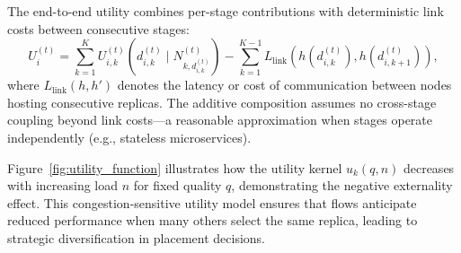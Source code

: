 \documentclass[journal]{IEEEtran}
\theoremstyle{plain}
\theoremstyle{definition}
\theoremstyle{remark}
\begin{document}
The end-to-end utility combines per-stage contributions with deterministic link costs between consecutive stages:
\begin{equation}
U_i^{(t)} = \sum_{k=1}^{K} U_{i,k}^{(t)}(d_{i,k}^{(t)} \mid N_{k,d_{i,k}^{(t)}}^{(t)}) - \sum_{k=1}^{K-1} L_{\text{link}}(h(d_{i,k}^{(t)}), h(d_{i,k+1}^{(t)})),
\label{eq:e2e_utility}
\end{equation}
where $L_{\text{link}}(h,h')$ denotes the latency or cost of communication between nodes hosting consecutive replicas. The additive composition assumes no cross-stage coupling beyond link costs—a reasonable approximation when stages operate independently (e.g., stateless microservices).

Figure~\ref{fig:utility_function} illustrates how the utility kernel $u_k(q,n)$ decreases with increasing load $n$ for fixed quality $q$, demonstrating the negative externality effect. This congestion-sensitive utility model ensures that flows anticipate reduced performance when many others select the same replica, leading to strategic diversification in placement decisions.
\end{document}
